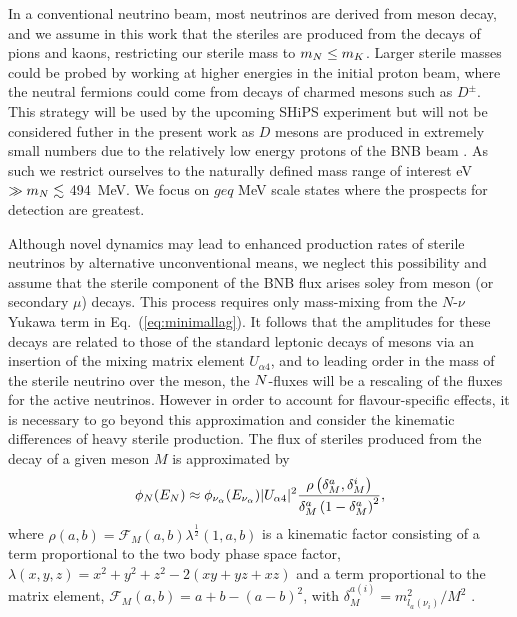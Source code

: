 \documentclass[11pt, a4paper]{article}
\newcommand{\refeq}[1]{Eq.~(\ref{#1})}
\def\ster{\ensuremath N}
\begin{document}
In a conventional neutrino beam, most neutrinos are derived from meson decay,
and we assume in this work that the steriles are produced from the decays of
pions and kaons, restricting our sterile mass to $m_\ster \le m_K$.
%
Larger sterile masses could be probed by working at higher energies in the initial proton beam, where the
neutral fermions could come from decays of charmed mesons such as $D^\pm$. This
strategy will be used by the upcoming SHiPS experiment \cite{Alekhin:2015byh,
Anelli:2015pba} but will not be considered futher in the present work as $D$
mesons are produced in extremely small numbers due to the relatively low energy
protons of the BNB beam \cite{AguilarArevalo:2008yp}. As such we restrict ourselves to the naturally defined mass range of interest eV $\gg m_\ster \lesssim$
494~MeV.  We focus on $geq$ MeV scale states where the prospects for detection are greatest.

%
Although novel dynamics may lead to enhanced production rates of sterile
neutrinos by alternative unconventional means, we neglect this possibility and
assume that the sterile component of the BNB flux arises soley from meson (or
secondary $\mu$) decays. This process requires only mass-mixing from the
$N$-$\nu$ Yukawa term in \refeq{eq:minimallag}. It follows that the amplitudes
for these decays are related to those of the standard leptonic decays of mesons
via an insertion of the mixing matrix element $U_{\alpha 4}$, and to leading
order in the mass of the sterile neutrino over the meson, the $\ster$-fluxes
will be a rescaling of the fluxes for the active neutrinos. 
%
However in order to account for flavour-specific effects, it is necessary to go beyond this approximation and consider the
kinematic differences of heavy sterile production.
%
The flux of steriles produced from the decay of a given meson $M$ is approximated
by
%
\[ \phi_{\ster}(E_{\ster}) \approx \phi_{\nu_\alpha} (E_{\nu_\alpha})\vert
U_{\alpha 4}\vert^2 \frac{\rho\left( \delta_M^a , \delta_M^i
\right)}{\delta_M^a \left(1- \delta_M^a\right)^2},  \]
%
where $\rho(a,b)=\mathcal{F}_M(a,b) \lambda^{\frac{1}{2}}(1,a,b)$ is a
kinematic factor consisting of a term proportional to the two body phase space
factor, $\lambda(x,y,z)=x^2+y^2+z^2-2(x y+yz+x z)$ and a term proportional to
the matrix element, $\mathcal{F}_M(a,b)= a+b -\left(a-b\right)^2$, with
$\delta_M^{a(i)}=m_{l_a(\nu_i)}^2/M^2$ \cite{PhysRevD.24.1232}. 
\end{document}
